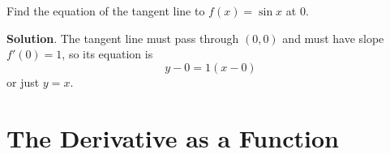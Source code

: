 \documentclass[10pt,]{book}
\theoremstyle{ptxplainnotitle}
\theoremstyle{ptxplaintitle}
\theoremstyle{ptxplainnotitle}
\theoremstyle{ptxplaintitle}
\theoremstyle{ptxplainnotitle}
\theoremstyle{ptxplaintitle}
\theoremstyle{ptxdefinitionnotitle}
\theoremstyle{ptxdefinitiontitle}
\theoremstyle{ptxdefinitionnotitle}
\theoremstyle{ptxdefinitiontitle}
\theoremstyle{ptxdefinitionnotitle}
\theoremstyle{ptxdefinitiontitle}
\theoremstyle{ptxdefinitionnotitle}
\theoremstyle{ptxdefinitiontitle}
\theoremstyle{ptxdefinitionnotitle}
\theoremstyle{ptxdefinitiontitle}
\numberwithin{equation}{section}
\begin{document}
\begin{example}\label{example-tangent-line-of-the-sine-function}
\hypertarget{p-98}{}%
Find the equation of the tangent line to \(f(x) = \sin x\) at \(0\).%
\par\smallskip%
\noindent\textbf{Solution}.\hypertarget{solution-21}{}\quad%
\hypertarget{p-99}{}%
The tangent line must pass through \((0,0)\) and must have slope \(f'(0) = 1\), so its equation is%
\begin{equation*}
y-0 = 1(x-0)
\end{equation*}
or just \(y=x\).%
\end{example}
\typeout{************************************************}
\typeout{************************************************}
\section[{The Derivative as a Function}]{The Derivative as a Function}\label{section-the-derivative-as-a-function}
\typeout{************************************************}
\typeout{************************************************}
\end{document}
